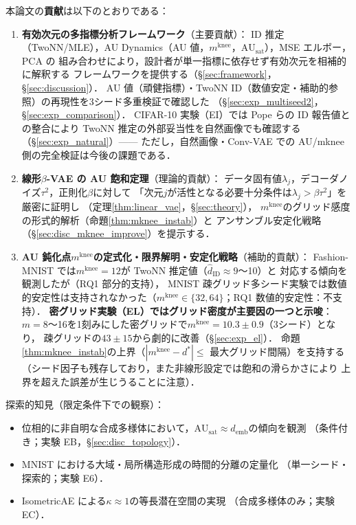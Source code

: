 \documentclass[11pt,a4paper]{jsarticle}
\newcommand{\kap}{\kappa}
\newcommand{\AUsat}{\mathrm{AU}_{\mathrm{sat}}}
\newcommand{\mknee}{m^{\mathrm{knee}}}
\newcommand{\demb}{d_{\mathrm{emb}}}
\begin{document}
本論文の\textbf{貢献}は以下のとおりである：
\begin{enumerate}
  \item \textbf{有効次元の多指標分析フレームワーク}（主要貢献）：
        ID 推定（TwoNN/MLE），AU Dynamics（AU 値，$\mknee$，$\AUsat$），MSE エルボー，PCA の
        組み合わせにより，設計者が単一指標に依存せず有効次元を相補的に解釈する
        フレームワークを提供する（§\ref{sec:framework}，§\ref{sec:discussion}）．
        AU 値（頑健指標）・TwoNN ID（数値安定・補助的参照）の再現性を3シード多重検証で確認した
        （§\ref{sec:exp_multiseed2}，§\ref{sec:exp_comparison}）．
        CIFAR-10 実験（EI）では Pope ら\cite{pope2021intrinsic}の ID 報告値との整合により
        TwoNN 推定の外部妥当性を自然画像でも確認する（§\ref{sec:exp_natural}）——
        ただし，自然画像・Conv-VAE での AU/mknee 側の完全検証は今後の課題である．
  \item \textbf{線形$\beta$-VAE の AU 飽和定理}（理論的貢献）：
        データ固有値$\lambda_j$，デコーダノイズ$\tau^2$，正則化$\beta$に対して
        「次元$j$が活性となる必要十分条件は$\lambda_j > \beta\tau^2$」を厳密に証明し
        （定理\ref{thm:linear_vae}，§\ref{sec:theory}），
        $\mknee$のグリッド感度の形式的解析（命題\ref{thm:mknee_instab}）と
        アンサンブル安定化戦略（§\ref{sec:disc_mknee_improve}）を提示する．
  \item \textbf{AU 鈍化点$\mknee$の定式化・限界解明・安定化戦略}（補助的貢献）：
        Fashion-MNIST では$\mknee = 12$が TwoNN 推定値（$\hat{d}_\mathrm{ID} \approx 9$〜10）と
        対応する傾向を観測したが（RQ1 部分的支持），
        MNIST 疎グリッド多シード実験では数値的安定性は支持されなかった（$\mknee \in \{32,64\}$；RQ1 数値的安定性：不支持）．
        \textbf{密グリッド実験（EL）ではグリッド密度が主要因の一つと示唆}：
        $m=8$〜16を1刻みにした密グリッドで$\mknee = 10.3 \pm 0.9$（3シード）となり，
        疎グリッドの$43 \pm 15$から劇的に改善（§\ref{sec:exp_el}）．
        命題\ref{thm:mknee_instab}の上界（$|\mknee - d^*| \leq$ 最大グリッド間隔）を支持する
        （シード因子も残存しており，また非線形設定では飽和の滑らかさにより
        上界を超えた誤差が生じうることに注意）．
\end{enumerate}

探索的知見（限定条件下での観察）：
\begin{itemize}
  \item 位相的に非自明な合成多様体において，$\AUsat \approx \demb$の傾向を観測
        （条件付き；実験 EB，§\ref{sec:disc_topology}）．
  \item MNIST における大域・局所構造形成の時間的分離の定量化
        （単一シード・探索的；実験 E6）．
  \item IsometricAE による$\kap \approx 1$の等長潜在空間の実現
        （合成多様体のみ；実験 EC）．
\end{itemize}
\end{document}
